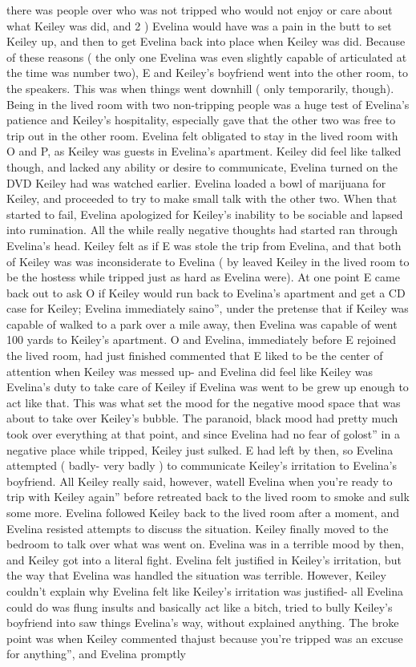 \documentclass[12pt]{book}
\begin{document}
there was people over who was not tripped who would not enjoy or care about what Keiley was did, and 2 ) Evelina would have was a pain in the butt to set Keiley up, and then to get Evelina back into place when Keiley was did. Because of these reasons ( the only one Evelina was even slightly capable of articulated at the time was number two), E and Keiley's boyfriend went into the other room, to the speakers. This was when things went downhill ( only temporarily, though). Being in the lived room with two non-tripping people was a huge test of Evelina's patience and Keiley's hospitality, especially gave that the other two was free to trip out in the other room. Evelina felt obligated to stay in the lived room with O and P, as Keiley was guests in Evelina's apartment. Keiley did feel like talked though, and lacked any ability or desire to communicate, Evelina turned on the DVD Keiley had was watched earlier. Evelina loaded a bowl of marijuana for Keiley, and proceeded to try to make small talk with the other two. When that started to fail, Evelina apologized for Keiley's inability to be sociable and lapsed into rumination. All the while really negative thoughts had started ran through Evelina's head. Keiley felt as if E was stole the trip from Evelina, and that both of Keiley was was inconsiderate to Evelina ( by leaved Keiley in the lived room to be the hostess while tripped just as hard as Evelina were). At one point E came back out to ask O if Keiley would run back to Evelina's apartment and get a CD case for Keiley; Evelina immediately saino'', under the pretense that if Keiley was capable of walked to a park over a mile away, then Evelina was capable of went 100 yards to Keiley's apartment. O and Evelina, immediately before E rejoined the lived room, had just finished commented that E liked to be the center of attention when Keiley was messed up- and Evelina did feel like Keiley was Evelina's duty to take care of Keiley if Evelina was went to be grew up enough to act like that. This was what set the mood for the negative mood space that was about to take over Keiley's bubble. The paranoid, black mood had pretty much took over everything at that point, and since Evelina had no fear of golost'' in a negative place while tripped, Keiley just sulked. E had left by then, so Evelina attempted ( badly- very badly ) to communicate Keiley's irritation to Evelina's boyfriend. All Keiley really said, however, watell Evelina when you're ready to trip with Keiley again'' before retreated back to the lived room to smoke and sulk some more. Evelina followed Keiley back to the lived room after a moment, and Evelina resisted attempts to discuss the situation. Keiley finally moved to the bedroom to talk over what was went on. Evelina was in a terrible mood by then, and Keiley got into a literal fight. Evelina felt justified in Keiley's irritation, but the way that Evelina was handled the situation was terrible. However, Keiley couldn't explain why Evelina felt like Keiley's irritation was justified- all Evelina could do was flung insults and basically act like a bitch, tried to bully Keiley's boyfriend into saw things Evelina's way, without explained anything. The broke point was when Keiley commented thajust because you're tripped was an excuse for anything'', and Evelina promptly 
\end{document}

